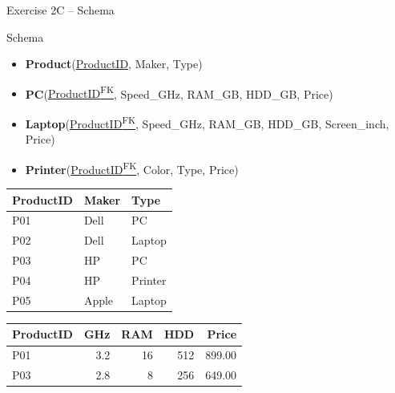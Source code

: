 \documentclass[10pt]{beamer}
\begin{document}
\begin{frame}{Exercise 2C -- Schema}
  \begin{block}{Schema}
    \begin{itemize}
      \item \textbf{Product}(\underline{ProductID}, Maker, Type)
      \item \textbf{PC}(\underline{ProductID\textsuperscript{FK}}, Speed\_GHz, RAM\_GB, HDD\_GB, Price)
      \item \textbf{Laptop}(\underline{ProductID\textsuperscript{FK}}, Speed\_GHz, RAM\_GB, HDD\_GB, Screen\_inch, Price)
      \item \textbf{Printer}(\underline{ProductID\textsuperscript{FK}}, Color, Type, Price)
    \end{itemize}
  \end{block}

  \small
  \begin{tabular}{|l|l|l|}
    \hline
    \textbf{ProductID} & \textbf{Maker} & \textbf{Type} \\
    \hline
    P01 & Dell & PC \\
    P02 & Dell & Laptop \\
    P03 & HP & PC \\
    P04 & HP & Printer \\
    P05 & Apple & Laptop \\
    \hline
  \end{tabular}
  \quad
  \begin{tabular}{|l|r|r|r|r|}
    \hline
    \textbf{ProductID} & \textbf{GHz} & \textbf{RAM} & \textbf{HDD} & \textbf{Price} \\
    \hline
    P01 & 3.2 & 16 & 512 & 899.00 \\
    P03 & 2.8 & 8 & 256 & 649.00 \\
    \hline
  \end{tabular}
\end{frame}
\end{document}
